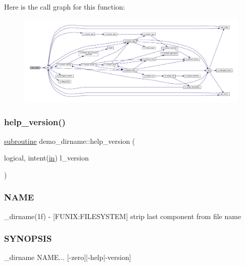 Here is the call graph for this function\+:
\nopagebreak
\begin{figure}[H]
\begin{center}
\leavevmode
\includegraphics[width=350pt]{__dirname_8f90_a3d60364463c9076e431b8d8c043cbd1c_cgraph}
\end{center}
\end{figure}
\mbox{\label{__dirname_8f90_a948f25e883089a17879425d9c31c64cd}} 
\subsubsection{\texorpdfstring{help\+\_\+version()}{help\_version()}}
{\footnotesize\ttfamily \hyperlink{M__stopwatch_83_8txt_acfbcff50169d691ff02d4a123ed70482}{subroutine} demo\+\_\+dirname\+::help\+\_\+version (\begin{DoxyParamCaption}\item[{logical, intent(\hyperlink{M__journal_83_8txt_afce72651d1eed785a2132bee863b2f38}{in})}]{l\+\_\+version }\end{DoxyParamCaption})}



\subsubsection*{N\+A\+ME}

\+\_\+dirname(1f) -\/ \mbox{[}F\+U\+N\+IX\+:F\+I\+L\+E\+S\+Y\+S\+T\+EM\mbox{]} strip last component from file name 

\subsubsection*{S\+Y\+N\+O\+P\+S\+IS}

\begin{DoxyVerb}_dirname NAME... [-zero]|-help|-version]
\end{DoxyVerb}


